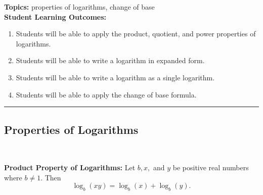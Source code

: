 
\noindent \textbf{Topics:}  properties of logarithms, change of base\\

\noindent \textbf{Student Learning Outcomes:}
\begin{enumerate}
\item Students will be able to apply the product, quotient, and power properties of logarithms.
\item Students will be able to write a logarithm in expanded form.
\item Students will be able to write a logarithm as a single logarithm.
\item Students will be able to apply the change of base formula.
\end{enumerate}

\hrule 

\bigskip

\subsection{Properties of Logarithms} ~


\noindent \textbf{Product Property of Logarithms:} Let $b, x,$ and $y$ be positive real numbers where $b \neq 1.$  Then $$\log_b (xy)=\log_b (x) + \log_b(y).$$   



